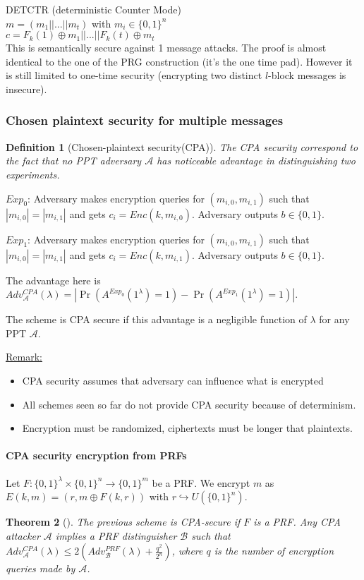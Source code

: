 \documentclass{article}
\newtheorem{thm}{Theorem}[section]
\newtheorem{defi}[thm]{Definition}
\newcommand{\Thm}[3]{\begin{thm}[#1]\label{#2}#3\end{thm}}
\newcommand{\Def}[3]{\begin{defi}[#1]\label{#2}#3\end{defi}}
\newcommand{\Rem}{\underline{Remark:} }
\newcommand{\A}{\mathcal{A}}
\newcommand{\B}{\mathcal{B}}
\newcommand{\bit}{\{0,1\}}
\begin{document}
DETCTR (deterministic Counter Mode)\\
$m=(m_1||...||m_t)$ with $m_i\in\bit^n$\\
$c=F_k(1)\oplus m_1||...||F_k(t)\oplus m_t$\\
This is semantically secure against 1 message attacks. The proof is almost identical to the one of the PRG construction (it's the one time pad). However it is still limited to one-time security (encrypting two distinct $l$-block messages is insecure).

\subsubsection{Chosen plaintext security for multiple messages}
\Def{Chosen-plaintext security(CPA)}{def:CPAsecure}{The CPA security correspond to the fact that no PPT adversary $\A$ has noticeable advantage in distinguishing two experiments.}

$Exp_0$: Adversary makes encryption queries for $(m_{i,0},m_{i,1})$ such that $|m_{i,0}|=|m_{i,1}|$ and gets $c_i=Enc(k,m_{i,0})$. Adversary outputs $b\in\bit$.

$Exp_1$: Adversary makes encryption queries for $(m_{i,0},m_{i,1})$ such that $|m_{i,0}|=|m_{i,1}|$ and gets $c_i=Enc(k,m_{i,1})$. Adversary outputs $b\in\bit$.

The advantage here is $Adv_\A^{CPA}(\lambda)=|\Pr(A^{Exp_0}(1^\lambda)=1)-\Pr(A^{Exp_1}(1^\lambda)=1)|$.

The scheme is CPA secure if this advantage is a negligible function of $\lambda$ for any PPT $\A$.

\Rem \begin{itemize}
\item CPA security assumes that adversary can influence what is encrypted
\item All schemes seen so far do not provide CPA security because of determinism.
\item Encryption must be randomized, ciphertexts must be longer that plaintexts.
\end{itemize}

\paragraph{CPA security encryption from PRFs} Let $F:\bit^\lambda\times\bit^n\rightarrow\bit^m$ be a PRF. We encrypt $m$ as $E(k,m)=(r,m\oplus F(k,r))$ with $r\hookrightarrow U(\bit^n)$.

\Thm{}{thm:CPAsecurePRF}{The previous scheme is CPA-secure if $F$ is a PRF. Any CPA attacker $\A$ implies a PRF distinguisher $\B$ such that $Adv_\A^{CPA}(\lambda)\leq 2(Adv_\B^{PRF}(\lambda)+\frac{q^2}{2^n})$, where $q$ is the number of encryption queries made by $\A$.}
\end{document}
